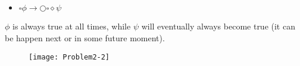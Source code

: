 \subsection{}

\begin{itemize}
   \item[] $\square \phi \rightarrow \bigcirc \square \diamond \psi$ 
\end{itemize}

\indent $\phi$ is always true at all times, while $\psi$ will eventually always become true (it can be happen next or in some future moment).

\begin{figure}[h!]
	\centering \texttt{[image: Problem2-2]}
\end{figure}
